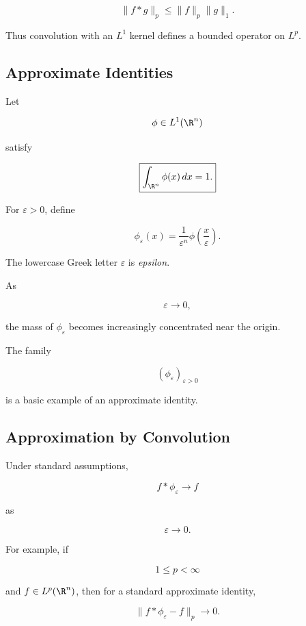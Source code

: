 \[
\boxed{
\|f*g\|_p
\leq
\|f\|_p\|g\|_1.
}
\]

Thus convolution with an \(L^1\) kernel defines a bounded operator on
\(L^p\).

\subsection{Approximate Identities}
\label{subsec:harmonic-approximate-identities}

Let

\[
\phi\in L^1(\R^n)
\]

satisfy

\[
\boxed{
\int_{\R^n}\phi(x)\,dx=1.
}
\]

For \(\varepsilon>0\), define

\[
\boxed{
\phi_\varepsilon(x)
=
\frac{1}{\varepsilon^n}
\phi\left(\frac{x}{\varepsilon}\right).
}
\]

The lowercase Greek letter \(\varepsilon\) is \emph{epsilon}.

As

\[
\varepsilon\to0,
\]

the mass of \(\phi_\varepsilon\) becomes increasingly concentrated near
the origin.

The family

\[
(\phi_\varepsilon)_{\varepsilon>0}
\]

is a basic example of an approximate identity.

\subsection{Approximation by Convolution}
\label{subsec:approximation-by-convolution}

Under standard assumptions,

\[
\boxed{
f*\phi_\varepsilon
\to
f
}
\]

as

\[
\varepsilon\to0.
\]

For example, if

\[
1\leq p<\infty
\]

and \(f\in L^p(\R^n)\), then for a standard approximate identity,

\[
\boxed{
\|f*\phi_\varepsilon-f\|_p
\to0.
}
\]

